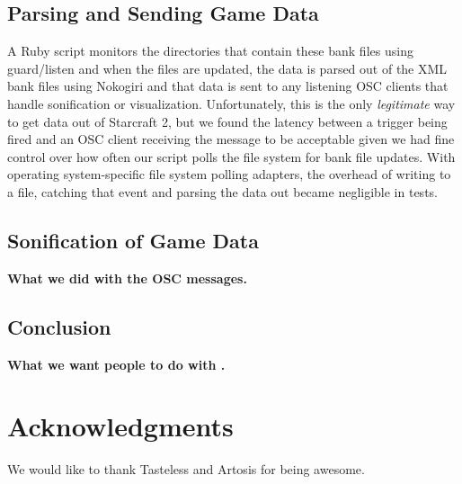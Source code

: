 \documentclass{nime-document-class}
\begin{document}
\subsection{Parsing and Sending Game Data}
A Ruby script monitors the directories that contain these bank files using guard/listen and when the files are updated, the data is parsed out of the XML bank files using Nokogiri and that data is sent to any listening OSC clients that handle sonification or visualization.
Unfortunately, this is the only {\em legitimate} way to get data out of Starcraft 2, but we found the latency between a trigger being fired and an OSC client receiving the message to be acceptable given we had fine control over how often our script polls the file system for bank file updates.
With operating system-specific file system polling adapters, the overhead of writing to a file, catching that event and parsing the data out became negligible in tests.

\subsection{Sonification of Game Data}
{\bf What we did with the OSC messages.}

\subsection{Conclusion}
{\bf What we want people to do with \projectName{}.}

\section{Acknowledgments}
We would like to thank Tasteless and Artosis for being awesome.

{}


\end{document}
